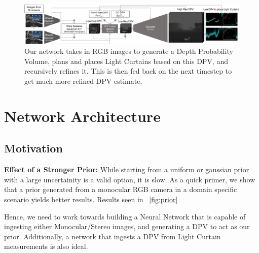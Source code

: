 \begin{figure}[t!]
    \includegraphics[width=1.0\textwidth]{figures/network.pdf}
    \caption{Our network takes in RGB images to generate a Depth Probability Volume, plans and places Light Curtains based on this DPV, and recursively refines it. This is then fed back on the next timestep to get much more refined DPV estimate. }
    \label{fig:network}
\end{figure}
    
\section{Network Architecture}

\subsection{Motivation}

\textbf{Effect of a Stronger Prior:} While starting from a uniform or gaussian prior with a large uncertainity is a valid option, it is slow. As a quick primer, we show that a prior generated from a monocular RGB camera in a domain specific scenario yields better results. Results seen in ~\ref{fig:prior}

Hence, we need to work towards building a Neural Network that is capable of ingesting either Monocular/Stereo images, and generating a DPV to act as our prior. Additionally, a network that ingests a DPV from Light Curtain measurements is also ideal.

